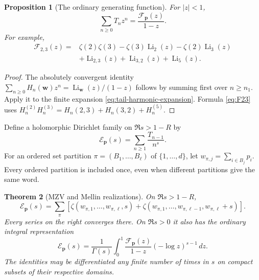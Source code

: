 \documentclass[11pt,letterpaper]{article}
\numberwithin{equation}{section}
\newtheorem{theorem}{Theorem}[section]
\newtheorem{proposition}[theorem]{Proposition}
\theoremstyle{definition}\newtheorem{definition}[theorem]{Definition}
\theoremstyle{remark}\newtheorem{remark}[theorem]{Remark}
\DeclareMathOperator{\Li}{Li}
\newcommand{\dd}{\,d}
\begin{document}
\begin{proposition}[The ordinary generating function]\label{prop:kernel}
For $|z|<1$,
\begin{equation}\label{eq:tailGF}
 \boxed{\sum_{n\ge0}T_nz^n=\frac{\mathcal F_{\boldsymbol p}(z)}{1-z}.}
\end{equation}
For example,
\begin{equation}\label{eq:F23}
\begin{split}
 \mathcal F_{2,3}(z)={}&\zeta(2)\zeta(3)-\zeta(3)\Li_2(z)
 -\zeta(2)\Li_3(z)\\
 &+\Li_{2,3}(z)+\Li_{3,2}(z)+\Li_5(z).
\end{split}
\end{equation}
\end{proposition}
\begin{proof}
The absolutely convergent identity
$\sum_{n\ge0}H_n(\boldsymbol w)z^n=\Li_{\boldsymbol w}(z)/(1-z)$
follows by summing first over $n\ge n_1$. Apply it to the finite
expansion \eqref{eq:tail-harmonic-expansion}. Formula
\eqref{eq:F23} uses $H_n^{(2)}H_n^{(3)}=H_n(2,3)+H_n(3,2)+H_n^{(5)}$.
\end{proof}

Define a holomorphic Dirichlet family on $\Re s>1-R$ by
\begin{equation}\label{eq:Edef}
 \mathcal E_{\boldsymbol p}(s)=\sum_{n\ge1}\frac{T_{n-1}}{n^s}.
\end{equation}
For an ordered set partition $\pi=(B_1,\ldots,B_\ell)$ of
$\{1,\ldots,d\}$, let $w_{\pi,j}=\sum_{i\in B_j}p_i$.
Every ordered partition is included once, even when different
partitions give the same word.

\begin{theorem}[MZV and Mellin realizations]\label{thm:E}
On $\Re s>1-R$,
\begin{equation}\label{eq:E-MZV}
 \mathcal E_{\boldsymbol p}(s)=\sum_{\pi}\left[
 \zeta(w_{\pi,1},\ldots,w_{\pi,\ell},s)
 +\zeta(w_{\pi,1},\ldots,w_{\pi,\ell-1},w_{\pi,\ell}+s)
 \right].
\end{equation}
Every series on the right converges there. On $\Re s>0$ it also has
the ordinary integral representation
\begin{equation}\label{eq:E-integral}
 \boxed{\mathcal E_{\boldsymbol p}(s)=\frac1{\Gamma(s)}
 \int_0^1\frac{\mathcal F_{\boldsymbol p}(z)}{1-z}
                                  (-\log z)^{s-1}\dd z.}
\end{equation}
The identities may be differentiated any finite number of times
in $s$ on compact subsets of their respective domains.
\end{theorem}
\end{document}
